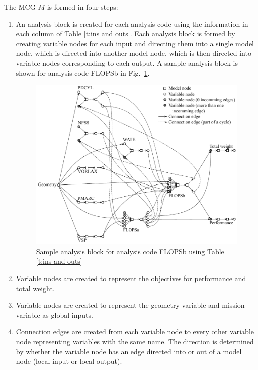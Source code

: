 	The MCG $M$ is formed in four steps:
	\begin{enumerate}
	\item An analysis block is created for each analysis code using the information in each column of Table \ref{t:ins and outs}. 
	Each analysis block is formed by creating variable nodes for each input and directing them into a single model node, which is directed into another model node, which is then directed into variable nodes corresponding to each output. 
	A sample analysis block is shown for analysis code FLOPSb in Fig.~\ref{f:FLOPSb analysis block}.
	\begin{figure}[htb!]
	  \begin{center}
		\includegraphics[width=6in]{images/MCG_edit_holes}
	  \end{center}
	  \caption{Sample analysis block for analysis code FLOPSb using Table \ref{t:ins and outs}}
	\label{f:FLOPSb analysis block}
	\end{figure}

	\item Variable nodes are created to represent the objectives for performance and total weight.

	\item Variable nodes are created to represent the geometry variable and mission variable as global inputs.

	\item Connection edges are created from each variable node to every other variable node representing variables with the same name. 
	The direction is determined by whether the variable node has an edge directed into or out of a model node (local input or local output).
	\end{enumerate}

